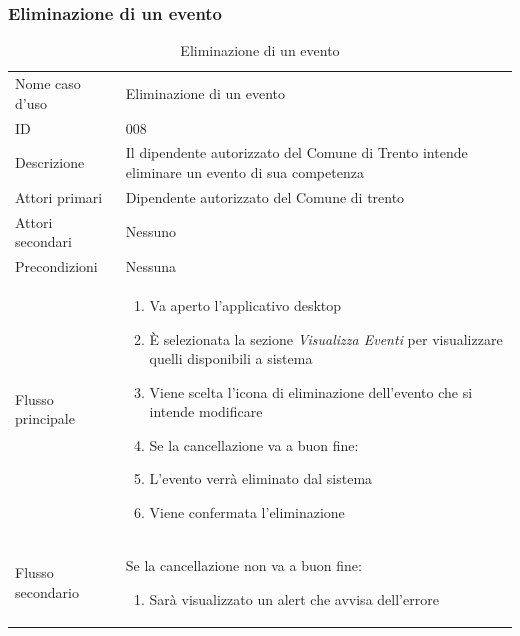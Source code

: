 \documentclass{article}
\begin{document}
\clearpage

\subsubsection{Eliminazione di un evento}

\begin{table}[htbp]
    \label{8.3.4}
    \centering
    \begin{tabularx}{\textwidth}{| l | p{} |}
        \Xhline{2pt} %
        Nome caso d'uso & Eliminazione di un evento \\
        \Xhline{2pt} %
        ID & 008 \\
        \hline
        Descrizione & Il dipendente autorizzato del Comune di Trento intende eliminare un evento di sua competenza\\
        \hline
        Attori primari & Dipendente autorizzato del Comune di trento\\
        \hline
        Attori secondari & Nessuno \\
        \hline
        Precondizioni & Nessuna \\
        \hline
        Flusso principale & 
        \begin{enumerate}[topsep=5pt,partopsep=0pt,parsep=0pt,itemsep=0pt,before=\vspace{-\baselineskip},after=\vspace{-\baselineskip}]                
            \item Va aperto l'applicativo desktop
            \item È selezionata la sezione \textit{Visualizza Eventi} per visualizzare quelli disponibili a sistema
            \item Viene scelta l'icona di eliminazione dell'evento che si intende modificare
            \item Se la cancellazione va a buon fine:
            \item L'evento verrà eliminato dal sistema
            \item Viene confermata l'eliminazione
        \end{enumerate}
        \\
        \hline
        Flusso secondario & 
        Se la cancellazione non va a buon fine:
        \begin{enumerate}[topsep=10pt,partopsep=0pt,parsep=0pt,itemsep=0pt,before=\vspace{-\baselineskip},after=\vspace{-\baselineskip}]
            \item Sarà visualizzato un alert che avvisa dell'errore
        \end{enumerate}
        \\
        \hline
    \end{tabularx}
    \caption{Eliminazione di un evento}
    \label{tab:tabella_use_case008}
\end{table}
\end{document}

